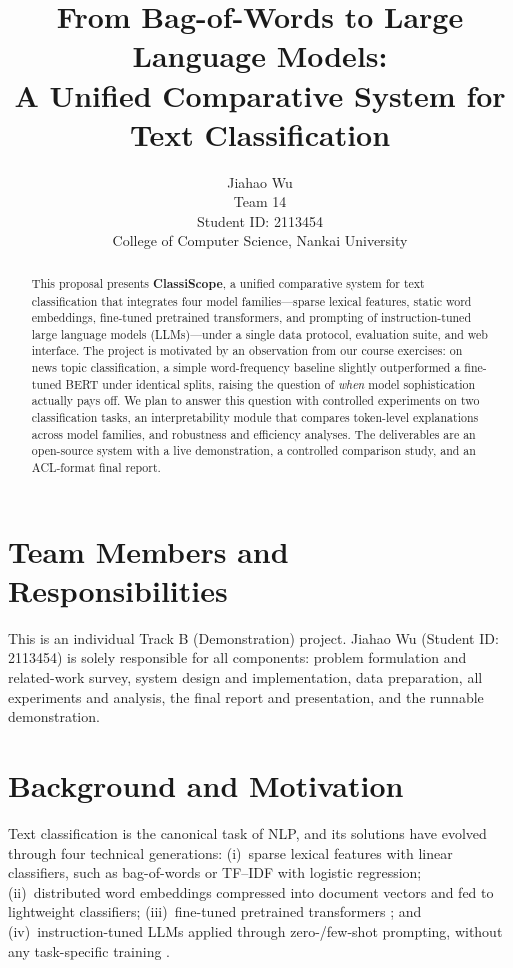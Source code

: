 \documentclass[11pt]{article}
\title{From Bag-of-Words to Large Language Models:\\ A Unified Comparative System for Text Classification}
\author{Jiahao Wu \\
  Team 14 \\
  Student ID: 2113454 \\
  College of Computer Science, Nankai University \\}
\begin{document}
\maketitle

\begin{abstract}
This proposal presents \textbf{ClassiScope}, a unified comparative system for text classification that integrates four model families---sparse lexical features, static word embeddings, fine-tuned pretrained transformers, and prompting of instruction-tuned large language models (LLMs)---under a single data protocol, evaluation suite, and web interface. The project is motivated by an observation from our course exercises: on news topic classification, a simple word-frequency baseline slightly outperformed a fine-tuned BERT under identical splits, raising the question of \emph{when} model sophistication actually pays off. We plan to answer this question with controlled experiments on two classification tasks, an interpretability module that compares token-level explanations across model families, and robustness and efficiency analyses. The deliverables are an open-source system with a live demonstration, a controlled comparison study, and an ACL-format final report.
\end{abstract}

\section{Team Members and Responsibilities}

This is an individual Track B (Demonstration) project. Jiahao Wu (Student ID: 2113454) is solely responsible for all components: problem formulation and related-work survey, system design and implementation, data preparation, all experiments and analysis, the final report and presentation, and the runnable demonstration.

\section{Background and Motivation}

Text classification is the canonical task of NLP, and its solutions have evolved through four technical generations: (i)~sparse lexical features with linear classifiers, such as bag-of-words or TF--IDF with logistic regression; (ii)~distributed word embeddings \citep{mikolov2013efficient,pennington2014glove} compressed into document vectors and fed to lightweight classifiers; (iii)~fine-tuned pretrained transformers \citep{vaswani2017attention,devlin-etal-2019-bert}; and (iv)~instruction-tuned LLMs applied through zero-/few-shot prompting, without any task-specific training \citep{brown2020language,ouyang2022training,qwen2025}.
\end{document}
